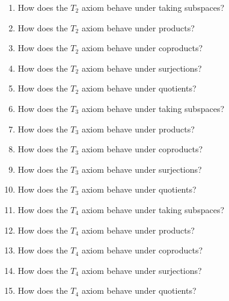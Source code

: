 \begin{enumerate}
    \item How does the \( T_2 \) axiom behave under taking subspaces?
    \item How does the \( T_2 \) axiom behave under products?
    \item How does the \( T_2 \) axiom behave under coproducts?
    \item How does the \( T_2 \) axiom behave under surjections?
    \item How does the \( T_2 \) axiom behave under quotients?
    \item How does the \( T_3 \) axiom behave under taking subspaces?
    \item How does the \( T_3 \) axiom behave under products?
    \item How does the \( T_3 \) axiom behave under coproducts?
    \item How does the \( T_3 \) axiom behave under surjections?
    \item How does the \( T_3 \) axiom behave under quotients?
    \item How does the \( T_4 \) axiom behave under taking subspaces?
    \item How does the \( T_4 \) axiom behave under products?
    \item How does the \( T_4 \) axiom behave under coproducts?
    \item How does the \( T_4 \) axiom behave under surjections?
    \item How does the \( T_4 \) axiom behave under quotients?
\end{enumerate}
